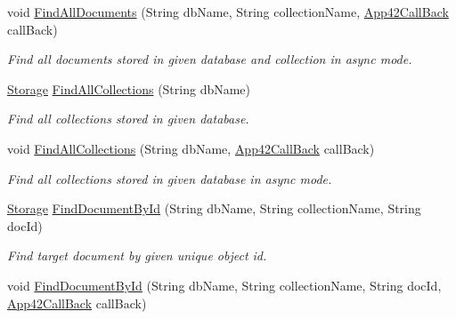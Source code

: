 \begin{DoxyCompactItemize}
void \hyperlink{classcom_1_1shephertz_1_1app42_1_1paas_1_1sdk_1_1csharp_1_1storage_1_1_storage_service_abcc8a2f02528073879fcec1d6d3d5c49}{Find\+All\+Documents} (String db\+Name, String collection\+Name, \hyperlink{interfacecom_1_1shephertz_1_1app42_1_1paas_1_1sdk_1_1csharp_1_1_app42_call_back}{App42\+Call\+Back} call\+Back)
\begin{DoxyCompactList}\small\item\em Find all documents stored in given database and collection in async mode. \end{DoxyCompactList}\item 
\hyperlink{classcom_1_1shephertz_1_1app42_1_1paas_1_1sdk_1_1csharp_1_1storage_1_1_storage}{Storage} \hyperlink{classcom_1_1shephertz_1_1app42_1_1paas_1_1sdk_1_1csharp_1_1storage_1_1_storage_service_a58f5e3b5e60a58ca9f9ad477462f613f}{Find\+All\+Collections} (String db\+Name)
\begin{DoxyCompactList}\small\item\em Find all collections stored in given database. \end{DoxyCompactList}\item 
void \hyperlink{classcom_1_1shephertz_1_1app42_1_1paas_1_1sdk_1_1csharp_1_1storage_1_1_storage_service_ae327db258934c13a853704b46c0bdfb9}{Find\+All\+Collections} (String db\+Name, \hyperlink{interfacecom_1_1shephertz_1_1app42_1_1paas_1_1sdk_1_1csharp_1_1_app42_call_back}{App42\+Call\+Back} call\+Back)
\begin{DoxyCompactList}\small\item\em Find all collections stored in given database in async mode. \end{DoxyCompactList}\item 
\hyperlink{classcom_1_1shephertz_1_1app42_1_1paas_1_1sdk_1_1csharp_1_1storage_1_1_storage}{Storage} \hyperlink{classcom_1_1shephertz_1_1app42_1_1paas_1_1sdk_1_1csharp_1_1storage_1_1_storage_service_ab06e1b72631abfe2e383852e811e7931}{Find\+Document\+By\+Id} (String db\+Name, String collection\+Name, String doc\+Id)
\begin{DoxyCompactList}\small\item\em Find target document by given unique object id. \end{DoxyCompactList}\item 
void \hyperlink{classcom_1_1shephertz_1_1app42_1_1paas_1_1sdk_1_1csharp_1_1storage_1_1_storage_service_af152ea2c1ac17c561d8b9a8eb651e7f4}{Find\+Document\+By\+Id} (String db\+Name, String collection\+Name, String doc\+Id, \hyperlink{interfacecom_1_1shephertz_1_1app42_1_1paas_1_1sdk_1_1csharp_1_1_app42_call_back}{App42\+Call\+Back} call\+Back)

\end{DoxyCompactItemize}
